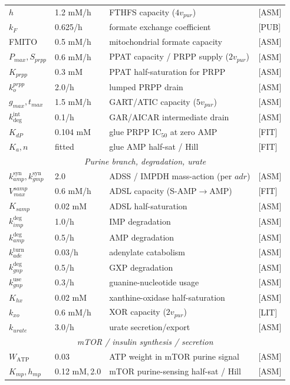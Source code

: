 \documentclass[11pt]{article}
\begin{document}
\begin{longtable}{@{}llll@{}}
$h$ & 1.2 mM/h & FTHFS capacity ($4v_{pur}$) & [ASM]\\
$k_F$ & 0.625/h & formate exchange coefficient & [PUB]\\
FMITO & 0.5 mM/h & mitochondrial formate capacity & [ASM]\\
$P_{max},S_{prpp}$ & 0.6 mM/h & PPAT capacity / PRPP supply ($2v_{pur}$) & [ASM]\\
$K_{prpp}$ & 0.3 mM & PPAT half-saturation for PRPP & [ASM]\\
$k_o^{prpp}$ & 2.0/h & lumped PRPP drain & [ASM]\\
$g_{max},t_{max}$ & 1.5 mM/h & GART/ATIC capacity ($5v_{pur}$) & [ASM]\\
$k_{\mathrm{deg}}^{\mathrm{int}}$ & 0.1/h & GAR/AICAR intermediate drain & [ASM]\\
$K_{dP}$ & 0.104 mM & glue PRPP IC$_{50}$ at zero AMP & [FIT]\\
$K_a,n$ & fitted & glue AMP half-sat / Hill & [FIT]\\
\midrule
\multicolumn{4}{c}{\textit{Purine branch, degradation, urate}}\\
$k_{amp}^{\mathrm{syn}},k_{gmp}^{\mathrm{syn}}$ & 2.0 & ADSS / IMPDH mass-action (per $adr$) & [ASM]\\
$V_{max}^{samp}$ & 0.6 mM/h & ADSL capacity (S-AMP$\to$AMP) & [FIT]\\
$K_{samp}$ & 0.02 mM & ADSL half-saturation & [ASM]\\
$k_{imp}^{\mathrm{deg}}$ & 1.0/h & IMP degradation & [ASM]\\
$k_{amp}^{\mathrm{deg}}$ & 0.5/h & AMP degradation & [ASM]\\
$k_{ade}^{\mathrm{turn}}$ & 0.03/h & adenylate catabolism & [ASM]\\
$k_{gnp}^{\mathrm{deg}}$ & 0.5/h & GXP degradation & [ASM]\\
$k_{gnp}^{\mathrm{use}}$ & 0.3/h & guanine-nucleotide usage & [ASM]\\
$K_{hx}$ & 0.02 mM & xanthine-oxidase half-saturation & [ASM]\\
$k_{xo}$ & 0.6 mM/h & XOR capacity ($2v_{pur}$) & [LIT]\\
$k_{urate}$ & 3.0/h & urate secretion/export & [ASM]\\
\midrule
\multicolumn{4}{c}{\textit{mTOR / insulin synthesis / secretion}}\\
$W_{\mathrm{ATP}}$ & 0.03 & ATP weight in mTOR purine signal & [ASM]\\
$K_{mp},h_{mp}$ & 0.12 mM,\,2.0 & mTOR purine-sensing half-sat / Hill & [ASM]\\

\end{longtable}
\end{document}

